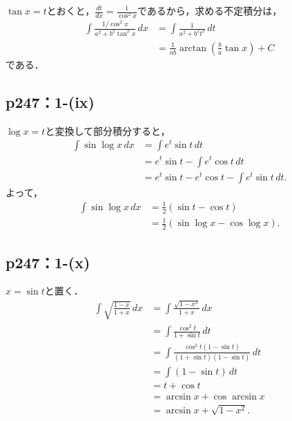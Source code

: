 \documentclass[a4paper,10pt,fleqn]{ltjsarticle}
\begin{document}
\begin{tleftbar}
    $\tan x = t$とおくと，$\frac{dt}{dx}= \frac{1}{\cos ^2 x}$であるから，求める不定積分は，
    \begin{align*}
        \int \frac{1/\cos ^2 x}{a^2 + b^2 \tan ^2 x} \, dx & = \int \frac{1}{a^2+b^2 t^2} \, dt                          \\
                                                           & = \frac{1}{ab} \arctan \left (\frac{b}{a} \tan x \right)+ C
    \end{align*}
    である．
\end{tleftbar}



\subsection*{p247：1-(ix)}
\begin{leftbar}
    $\log x = t$と変換して部分積分すると，
    \begin{align*}
        \int \sin \log x \,dx
         & = \int e^t \sin t \,dt                            \\
         & = e^t \sin t - \int e^t \cos t \,dt               \\
         & = e^t \sin t - e^t \cos t - \int e^t \sin t \,dt.
    \end{align*}
    よって，
    \begin{align*}
        \int \sin \log x \,dx
         & = \frac{1}{2}(\sin t - \cos t)            \\
         & = \frac{1}{2}(\sin \log x - \cos \log x).
    \end{align*}
\end{leftbar}


\subsection*{p247：1-(x)}

\begin{leftbar}
    $x = \sin t$と置く．
    \begin{align*}
        \int \sqrt {\frac{1-x}{1+x}} \,dx
         & = \int \frac{\sqrt{1-x^2}}{1+x} \,dx                              \\
         & = \int \frac{\cos^2 t}{1 + \sin t} \,dt                           \\
         & = \int \frac{\cos^2 t(1 - \sin t)}{(1 + \sin t)(1 - \sin t)} \,dt \\
         & = \int (1 - \sin t) \,dt                                          \\
         & = t + \cos t                                                      \\
         & = \arcsin x  + \cos \arcsin x                                     \\
         & = \arcsin x + \sqrt{1-x^2}.
    \end{align*}
\end{leftbar}
\end{document}
